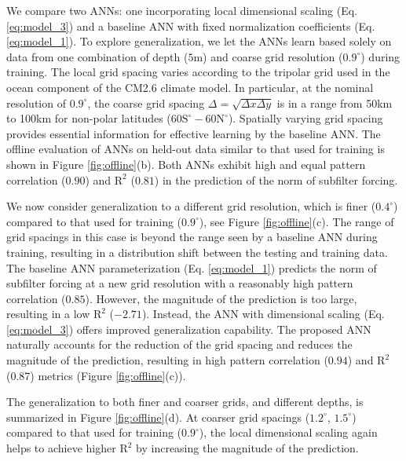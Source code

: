 \documentclass[draft]{agujournal2019}
\begin{document}
We compare two ANNs: one incorporating local dimensional scaling (Eq. \eqref{eq:model_3}) and a baseline ANN with fixed normalization coefficients (Eq. \eqref{eq:model_1}). To explore generalization, we let the ANNs learn based solely on data from one combination of depth ($5$m) and coarse grid resolution ($0.9^\circ$) during training. The local grid spacing varies according to the tripolar grid used in the ocean component of the CM2.6 climate model. In particular, at the nominal resolution of $0.9^\circ$, the coarse grid spacing $\Delta=\sqrt{\Delta x \Delta y}$ is in a range from 50km to 100km for non-polar latitudes ($60\mathrm{S}^\circ-60\mathrm{N}^\circ$). Spatially varying grid spacing provides essential information for effective learning by the baseline ANN. The offline evaluation of ANNs on held-out data similar to that used for training is shown in Figure \ref{fig:offline}(b). Both ANNs exhibit high and equal pattern correlation ($0.90$) and $\mathrm{R}^2$ ($0.81$) in the prediction of the norm of subfilter forcing. %

We now consider generalization to a different grid resolution, which is finer ($0.4^\circ$) compared to that used for training ($0.9^\circ$), see Figure \ref{fig:offline}(c). The range of grid spacings in this case is beyond the range seen by a baseline ANN during training, resulting in a distribution shift between the testing and training data.  The baseline ANN parameterization (Eq. \eqref{eq:model_1}) predicts the norm of subfilter forcing at a new grid resolution with a reasonably high pattern correlation ($0.85$). However, the magnitude of the prediction is too large, resulting in a low  $\mathrm{R}^2$ ($-2.71$). 
Instead, the ANN with dimensional scaling (Eq. \eqref{eq:model_3}) offers improved generalization capability. The proposed ANN naturally accounts for the reduction of the grid spacing and reduces the magnitude of the prediction, resulting in high pattern correlation ($0.94$) and $\mathrm{R}^2$ (0.87) metrics (Figure \ref{fig:offline}(c)). 

The generalization to both finer and coarser grids, and different depths, is summarized in Figure \ref{fig:offline}(d). At coarser grid spacings ($1.2^\circ$, $1.5^\circ$) compared to that used for training ($0.9^\circ$), the local dimensional scaling again helps to achieve higher $\mathrm{R}^2$ by increasing the magnitude of the prediction. 
\end{document}
